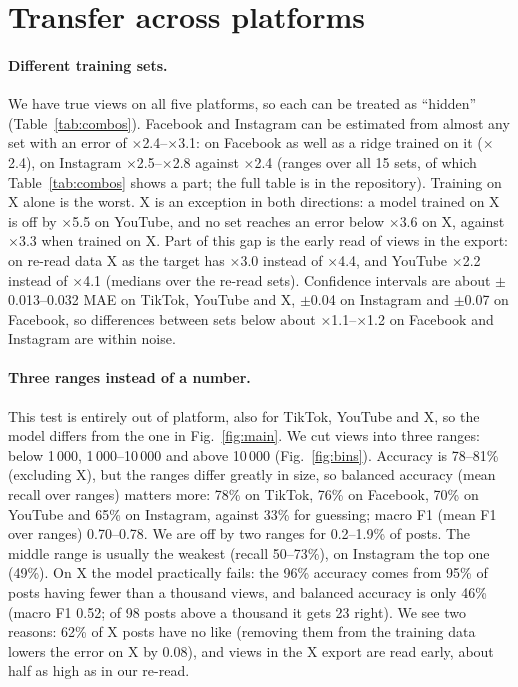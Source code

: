 \documentclass[10pt,a4paper]{article}
\newcommand{\x}[1]{$\times$#1}
\begin{document}
\section{Transfer across platforms}\label{sec:transfer}

\paragraph{Different training sets.} We have true views on all five platforms, so each can be treated as ``hidden''
(Table~\ref{tab:combos}). Facebook and Instagram can be estimated from almost any set with an error of
\x{2.4}--\x{3.1}: on Facebook as well as a ridge trained on it (\x{2.4}), on Instagram \x{2.5}--\x{2.8} against \x{2.4} (ranges over all 15 sets, of which Table~\ref{tab:combos} shows a part; the full table is in the repository). Training on X alone is the worst. X is an exception in both directions: a model trained on X is off by \x{5.5}
on YouTube, and no set reaches an error below \x{3.6} on X, against \x{3.3} when trained on X. Part of this gap is the
early read of views in the export: on re-read data X as the target has \x{3.0} instead of \x{4.4}, and YouTube \x{2.2}
instead of \x{4.1} (medians over the re-read sets). Confidence intervals are about $\pm$0.013--0.032 MAE on TikTok, YouTube and X,
$\pm$0.04 on Instagram and $\pm$0.07 on Facebook, so differences between sets below about \x{1.1}--\x{1.2} on Facebook
and Instagram are within noise.



\paragraph{Three ranges instead of a number.} This test is entirely out of platform, also for TikTok, YouTube and X,
so the model differs from the one in Fig.~\ref{fig:main}. We cut views into three ranges: below 1\,000, 1\,000--10\,000
and above 10\,000 (Fig.~\ref{fig:bins}). Accuracy is 78--81\% (excluding X), but the ranges differ greatly in size, so balanced
accuracy (mean recall over ranges) matters more: 78\% on TikTok, 76\% on Facebook, 70\% on YouTube and 65\% on
Instagram, against 33\% for guessing; macro F1 (mean F1 over ranges) 0.70--0.78. We are off by two ranges for 0.2--1.9\% of posts. The middle
range is usually the weakest (recall 50--73\%), on Instagram the top one (49\%). On X the model practically fails: the
96\% accuracy comes from 95\% of posts having fewer than a thousand views, and balanced accuracy is only 46\% (macro F1 0.52; of 98
posts above a thousand it gets 23 right). We see two reasons: 62\% of X posts have no like (removing them from the
training data lowers the error on X by 0.08), and views in the X export are read early, about half as high as in our re-read.
\end{document}
